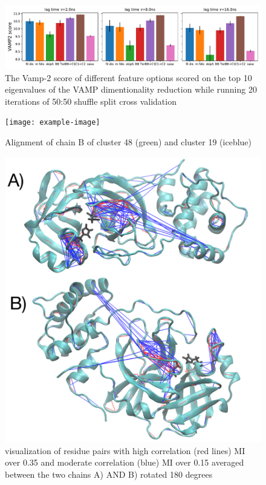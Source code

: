 \documentclass{biophys-new}
\begin{document}
\begin{figure}[h]
\centering
\graphicspath{ {./supplemental_figures/} }
\includegraphics[width=0.6\linewidth]{sup_fig_2vamp_score_10dim_20splits_both_3_zoom.pdf}
\caption{The Vamp-2 score of different feature options scored on the top 10 eigenvalues of the VAMP dimentionality reduction while running 20 iterations of 50:50 shuffle split cross validation}
\label{fig:view}
\end{figure}

\begin{figure}  %
\centering
\graphicspath{ {./supplemental_figures/} }
\texttt{[image: example-image]}
\caption{Alignment of chain B of cluster 48 (green) and cluster 19 (iceblue)}
\label{fig:view}
\end{figure}

\begin{figure}[ht]
\graphicspath{ {./supplemental_figures/} }
\centering
\includegraphics[width=0.6\linewidth]{Averaged_MI_image.pdf}
\caption{visualization of residue pairs with high correlation (red lines) MI over 0.35 and moderate correlation (blue) MI over 0.15 averaged between the two chains A) AND B) rotated 180 degrees}
\label{fig:view}
\end{figure}
\end{document}
